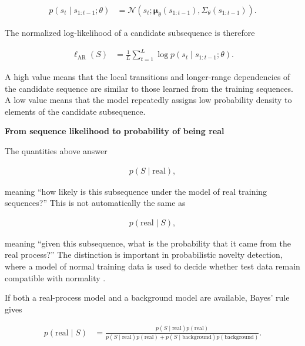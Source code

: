 \documentclass{book}
\providecommand{\ProjectDeepHeading}[2]{%
    \par\medskip\noindent\textbf{#2}\par\smallskip
}
\begin{document}
        \begin{align}
            p(s_t\mid s_{1:t-1};\ensuremath{\theta})
            &=
            \mathcal{N}
            \left(
            s_t;
            \boldsymbol{\ensuremath{\mu}}_\ensuremath{\theta}(s_{1:t-1}),
            \ensuremath{\Sigma}_\ensuremath{\theta}(s_{1:t-1})
            \right).
        \end{align}

        \noindent
        The normalized log-likelihood of a candidate subsequence is therefore

        \begin{align}
            \ell_{\mathrm{AR}}(S)
            &=
            \frac{1}{L}
            \sum_{t=1}^{L}
            \log p(s_t\mid s_{1:t-1};\ensuremath{\theta}).
        \end{align}

        \noindent
        A high value means that the local transitions and longer-range dependencies of the candidate sequence are similar to those learned from the training sequences. A low value means that the model repeatedly assigns low probability density to elements of the candidate subsequence.

    \ProjectDeepHeading{3}{From sequence likelihood to probability of being real}

        The quantities above answer

        \begin{align}
            p(S\mid\mathrm{real}),
        \end{align}

        \noindent
        meaning ``how likely is this subsequence under the model of real training sequences?'' This is not automatically the same as

        \begin{align}
            p(\mathrm{real}\mid S),
        \end{align}

        \noindent
        meaning ``given this subsequence, what is the probability that it came from the real process?'' The distinction is important in probabilistic novelty detection, where a model of normal training data is used to decide whether test data remain compatible with normality \cite{pimentel-clifton-clifton-tarassenko-2014-a-review-of-novelty-detection}.

        If both a real-process model and a background model are available, Bayes' rule gives

        \begin{align}
            p(\mathrm{real}\mid S)
            &=
            \frac{
            p(S\mid\mathrm{real})p(\mathrm{real})
            }{
            p(S\mid\mathrm{real})p(\mathrm{real})
            +
            p(S\mid\mathrm{background})p(\mathrm{background})
            }.
        \end{align}
\end{document}
